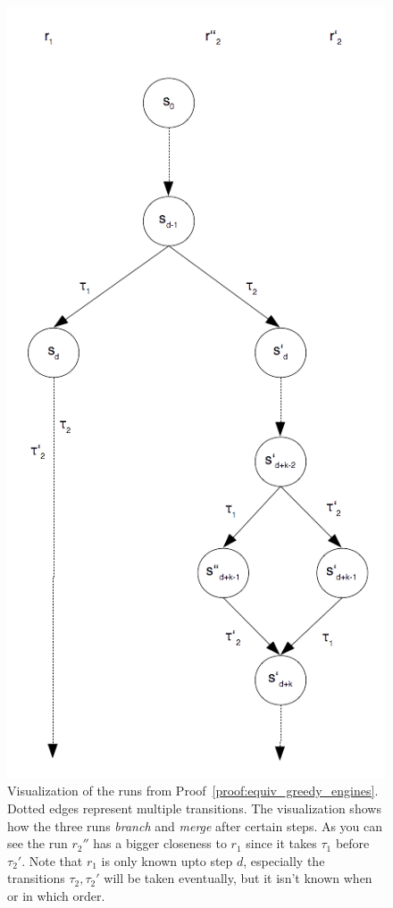 \begin{figure}
  \centering
  \includegraphics[height = 0.5\textheight]{content/figs/maximize_closeness}
  \caption{Visualization of the runs from Proof~\ref{proof:equiv_greedy_engines}. Dotted edges represent multiple transitions. The visualization shows how the three runs \emph{branch} and \emph{merge} after certain steps. As you can see the run \(r_2''\) has a bigger closeness to \(r_1\) since it takes \(\tau_1\) before \(\tau_2'\). Note that \(r_1\) is only known upto step \(d\), especially the transitions \(\tau_2, \tau_2'\) will be taken eventually, but it isn't known when or in which order.}
\label{fig:chap5:sec_greedy:maximize_closeness}
\end{figure}

